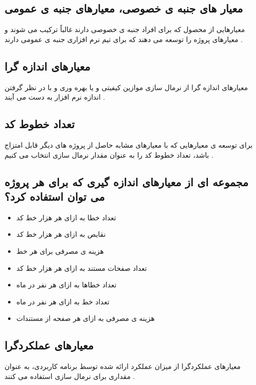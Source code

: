 \documentclass{article}
\begin{document}
\subsection{معیار های جنبه ی خصوصی، معیارهای جنبه ی عمومی}
معیارهایی از محصول که برای افراد جنبه ی خصوصی دارند غالباً ترکیب می شوند و معیارهای پروژه را توسعه می دهند که برای تیم نرم افزاری جنبه ی عمومی دارند .



\subsection{معیارهای اندازه گرا}

معیارهای اندازه گرا از نرمال سازی موازین کیفیتی و یا بهره وری و با در نظر گرفتن اندازه نرم افزار به دست می آیند .



\subsection{تعداد خطوط کد}
برای توسعه ی معیارهایی که با معیارهای مشابه حاصل از پروژه های دیگر قابل امتزاج باشد، تعداد خطوط کد را به عنوان مقدار نرمال سازی انتخاب می کنیم .


\subsection{مجموعه ای از معیارهای اندازه گیری که برای هر پروژه می توان استفاده کرد؟}

\begin{itemize}
	\item تعداد خطا به ازای هر هزار خط کد
	\item نقایص به ازای هر هزار خط کد
	\item هزینه ی مصرفی برای هر خط
	\item تعداد صفحات مستند به ازای هر هزار خط کد
	\item تعداد خطاها به ازای هر نفر در ماه
	\item تعداد خط به ازای هر نفر در ماه
	\item هزینه ی مصرفی به ازای هر صفحه از مستندات
\end{itemize}






\subsection{معیارهای عملکردگرا}
معیارهای عملکردگرا از میزان عملکرد ارائه شده توسط برنامه کاربردی، به عنوان مقداری برای نرمال سازی استفاده می کنند .
\end{document}
